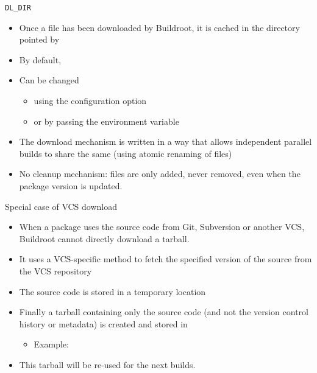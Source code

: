 \begin{frame}{{\tt DL\_DIR}}
  \begin{itemize}
  \item Once a file has been downloaded by Buildroot, it is cached in
    the directory pointed by 
  \item By default, 
  \item Can be changed
    \begin{itemize}
    \item using the  configuration option
    \item or by passing the  environment variable
    \end{itemize}
  \item The download mechanism is written in a way that allows
    independent parallel builds to share the same  (using
    atomic renaming of files)
  \item No cleanup mechanism: files are only added, never removed,
    even when the package version is updated.
  \end{itemize}
\end{frame}

\begin{frame}{Special case of VCS download}
  \begin{itemize}
  \item When a package uses the source code from Git, Subversion or
    another VCS, Buildroot cannot directly download a tarball.
  \item It uses a VCS-specific method to fetch the specified version
    of the source from the VCS repository
  \item The source code is stored in a temporary location
  \item Finally a tarball containing only the source code (and not the
    version control history or metadata) is created and stored in
    \begin{itemize}
    \item Example: 
    \end{itemize}
  \item This tarball will be re-used for the next builds.
  \end{itemize}
\end{frame}


